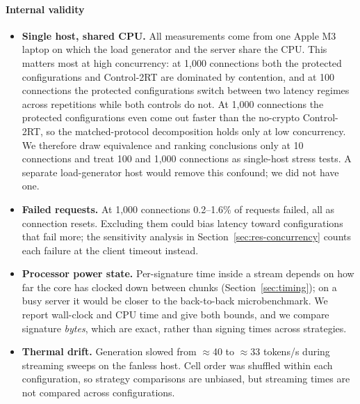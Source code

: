\documentclass[conference]{IEEEtran}
\begin{document}
\paragraph*{Internal validity}
\begin{itemize}
  \item \textbf{Single host, shared CPU.} All measurements come from one Apple M3 laptop on which the load
  generator and the server share the CPU. This matters most at high concurrency: at 1,000 connections
  both the protected configurations and Control-2RT are dominated by contention, and at 100 connections
  the protected configurations switch between two latency regimes across repetitions while both controls
  do not. At 1,000 connections the protected configurations even come out faster than the no-crypto
  Control-2RT, so the matched-protocol decomposition holds only at low concurrency. We therefore draw
  equivalence and ranking conclusions only at 10 connections and treat 100 and 1,000 connections as
  single-host stress tests. A separate load-generator host would remove this confound; we did not have one.
  \item \textbf{Failed requests.} At 1,000 connections 0.2--1.6\% of requests failed, all as connection
  resets. Excluding them could bias latency toward configurations that fail more; the sensitivity
  analysis in Section~\ref{sec:res-concurrency} counts each failure at the client timeout instead.
  \item \textbf{Processor power state.} Per-signature time inside a stream depends on how far the core
  has clocked down between chunks (Section~\ref{sec:timing}); on a busy server it would be closer to the
  back-to-back microbenchmark. We report wall-clock and CPU time and give both bounds, and we compare
  signature \emph{bytes}, which are exact, rather than signing times across strategies.
  \item \textbf{Thermal drift.} Generation slowed from $\approx$40 to $\approx$33 tokens/s during streaming
  sweeps on the fanless host. Cell order was shuffled within each configuration, so strategy comparisons
  are unbiased, but streaming times are not compared across configurations.
\end{itemize}
\end{document}
